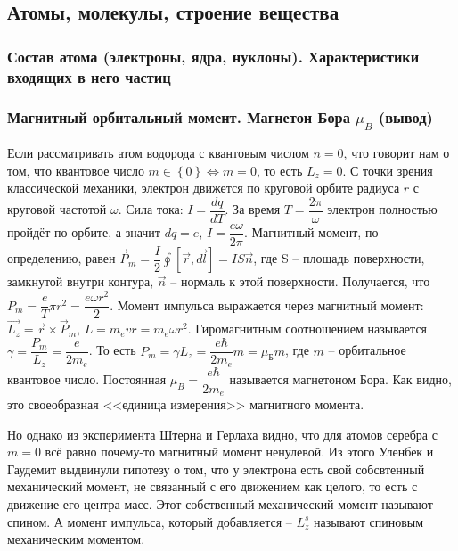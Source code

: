 \subsection{Атомы, молекулы, строение вещества}

\subsubsection{Состав атома (электроны, ядра, нуклоны). Характеристики входящих в него частиц}

\subsubsection{Магнитный орбитальный момент. Магнетон Бора $\mu_B$ (вывод)}

Если рассматривать атом водорода с квантовым числом $n=0$, что говорит нам о том, что квантовое
число $m \in \left\{ 0 \right\} \Leftrightarrow m=0$, то есть $L_z = 0$. С точки зрения
классической механики, электрон движется
по круговой орбите радиуса $r$ с круговой частотой $\omega$. Сила тока: $I = \dfrac{dq}{dT}$.
За время $T = \dfrac{2\pi}{\omega}$ электрон полностью пройдёт по орбите, а значит $dq = e$, 
$I = \dfrac{e \omega}{2\pi}$. Магнитный момент, по определению, равен
$\vec{P}_m = \dfrac{I}{2} \oint [\vec{r}, \vec{dl}] = I S \vec{n}$, где S -- площадь
поверхности, замкнутой внутри контура, $\vec{n}$ -- нормаль к этой поверхности.
Получается, что $P_m = \dfrac{e}{T} \pi r^2 = \dfrac{e \omega r^2}{2}$. Момент импульса
выражается через магнитный момент: $\vec{L_z} = \vec{r} \times \vec{P}_m$,
$L = m_e vr = m_e \omega r^2$.
Гиромагнитным соотношением называется $\gamma = \dfrac{P_m}{L_z} = \dfrac{e}{2m_e}$. 
То есть $P_m = \gamma L_z = \dfrac{e \hbar}{2 m_e} m = \mu_\text{Б} m$, где $m$ -- орбитальное квантовое число.
Постоянная $\mu_B = \dfrac{e \hbar}{2 m_e}$ называется магнетоном Бора. Как видно, это 
своеобразная <<единица измерения>> магнитного момента. 

Но однако из эксперимента Штерна и Герлаха видно, что для атомов серебра с $m=0$ всё равно
почему-то магнитный момент ненулевой. Из этого Уленбек и Гаудемит выдвинули гипотезу о том, 
что у электрона есть свой собсвтенный механический момент, не связанный с его движением как целого,
то есть с движение его центра масс. Этот собственный механический момент называют спином.
А момент импульса, который добавляется -- $L_z^s$ называют спиновым механическим моментом.

